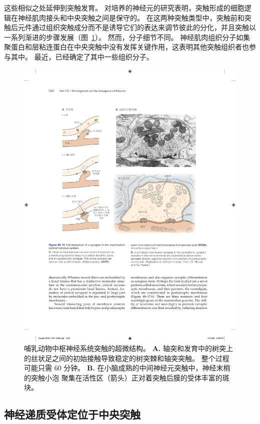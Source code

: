 这些相似之处延伸到突触发育。
对培养的神经元的研究表明，突触形成的细胞逻辑在神经肌肉接头和中央突触之间是保守的。
在这两种突触类型中，突触前和突触后元件通过组织突触成分而不是诱导它们的表达来调节彼此的分化，并且突触以一系列渐进的步骤发展（图~\ref{fig:48_15}）。
然而，分子细节不同。
神经肌肉组织分子如集聚蛋白和层粘连蛋白在中央突触中没有发挥关键作用，这表明其他突触组织者也参与其中。
最近，已经确定了其中一些组织分子。


\begin{figure}[htbp]
	\centering
	\includegraphics[width=1.0\linewidth]{chap48/fig_48_15}
	\caption{哺乳动物中枢神经系统突触的超微结构。
		\textbf{A.} 轴突和发育中的树突上的丝状足之间的初始接触导致稳定的树突棘和轴突突触。
		整个过程可能只需 60 分钟。
		\textbf{B.} 在小脑成熟的中间神经元突触中，神经末梢的突触小泡 聚集在活性区（箭头）正对着突触后膜的受体丰富的斑块。}
	\label{fig:48_15}
\end{figure}



\subsection{神经递质受体定位于中央突触}


